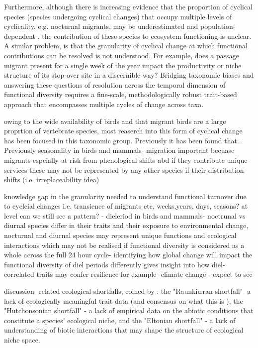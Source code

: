 \documentclass[11pt]{report}
\begin{document}
Furthermore, although there is increasing evidence that the proportion of cyclical species (species undergoing cyclical changes) that occupy multiple levels of cyclicality, e.g. nocturnal migrants, may be underestimated and population-dependent \citep{Gaston2019, https://doi.org/10.1002/ecs2.4149, 10.1098/rspb.2025.2023 }, the contribution of these species to ecosystem functioning is unclear.
A similar problem, is that the granularity of cyclical change at which functional contributions can be resolved is not understood. For example, does a passage migrant present for a single week of the year impact the productivity or niche structure of its stop-over site in a discernible way?
Bridging taxonomic biases and answering these questions of resolution across the temporal dimension of functional diversity requires a fine-scale, methodologically robust trait-based approach that encompasses multiple cycles of change across taxa.



owing to the wide availability of birds and that migrant birds are a large proprtion of vertebrate species, most reaserch into this form of cyclical change has been focused in this taxonomic group. Previously it has been found that...
Previously seasonality in birds and mammals- migration important becuase migrants espcially at risk from phenological shifts abd if they contribute unique services these may not be represented by any other species if their distribution shifts (i.e. irreplaceability idea)


knowledge gap in the granularity needed to understand functional turnover due to cyclcial changes i.e. transience of migrants etc, weeks,years, days, seasons? at level can we still see a pattern?
- dieleriod in birds and mammals- noctrunal vs diurnal species differ in their traits and their exposure to environmental change, nocturnal and diurnal species may represent unique functions and ecological interactions which may not be realised if functional diversity is considered as a whole across the full 24 hour cycle- identifying how global change will impact the functional diversity of diel periods differently gives insight into how diel-correlated traits may confer resilience for example
-climate change
- expect to see



discussion- related ecological shortfalls, coined by \citet{Hortal2015}: the "Raunkiæran shortfall"- a lack of ecologically meaningful trait data (and consensus on what this is \citep[see][]{Dawson2021}), the "Hutchonsonian shortfall" - a lack of empirical data on the abiotic conditions that constitute a species' ecological niche, and the "Eltonian shortfall" - a lack of understanding of biotic interactions that may shape the structure of ecological niche space.
\end{document}
